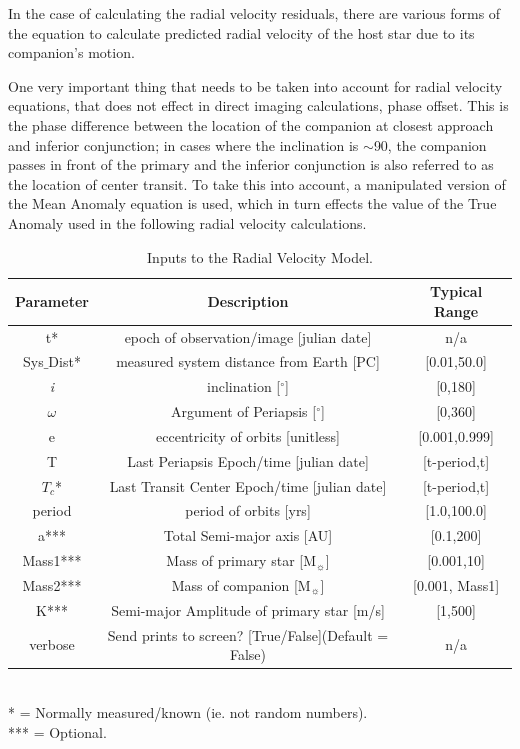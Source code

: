 \documentclass[12pt,preprint]{aastex}
\begin{document}
In the case of calculating the radial velocity residuals, there are various forms of the equation to calculate predicted radial velocity of the host star due to its companion's motion.

One very important thing that needs to be taken into account for radial velocity equations, that does not effect in direct imaging calculations, phase offset.  This is the phase difference between the location of the companion at closest approach and inferior conjunction; in cases where the inclination is $\sim$90, the companion passes in front of the primary and the inferior conjunction is also referred to as the location of center transit.  To take this into account, a manipulated version of the Mean Anomaly equation is used, which in turn effects the value of the True Anomaly used in the following radial velocity calculations.
\begin{table}[h]
\centering
\caption{ Inputs to the Radial Velocity Model.}
\begin{tabular}{c c c}
\hline\hline
Parameter & Description & Typical Range \\
\hline
t* & epoch of observation/image [julian date] & n/a\\
Sys$\_$Dist* & measured system distance from Earth [PC] &  [0.01,50.0]\\
{\it i} & inclination [$^{\circ}$] & [0,180]\\
$\omega$ & Argument of Periapsis [$^{\circ}$] & [0,360]\\
e & eccentricity of orbits [unitless] & [0.001,0.999]\\
T & Last Periapsis Epoch/time [julian date] & [t-period,t]\\
$T_c$* & Last Transit Center Epoch/time [julian date] & [t-period,t]\\
period & period of orbits [yrs] & [1.0,100.0]\\
a*** & Total Semi-major axis [AU]  & [0.1,200] \\
Mass1*** & Mass of primary star [M$_{\sun}$] & [0.001,10] \\
Mass2*** & Mass of companion [M$_{\sun}$] & [0.001, Mass1] \\
K*** & Semi-major Amplitude of primary star [m/s]& [1,500]\\
verbose & Send prints to screen? [True/False](Default = False) & n/a\\
\hline
\end{tabular}
\\
  * = Normally measured/known (ie. not random numbers).\\
 *** = Optional.
\end{table}
\end{document}
